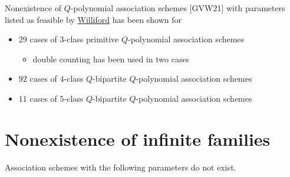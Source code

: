 \documentclass[11pt]{article}
\providecommand{\tightlist}{%
      \setlength{\itemsep}{0pt}\setlength{\parskip}{0pt}}
\renewcommand{\emph}[1]{\textcolor[rgb]{0,0,1}{{#1}}}
\renewcommand{\sout}[1]{\textcolor[rgb]{0,0.5,0}{{#1}}}
\begin{document}
\sout{Nonexistence} of \emph{\(Q\)-polynomial association schemes}
{[}GVW21{]} with parameters listed as \emph{feasible} by
\href{http://www.uwyo.edu/jwilliford/}{Williford} has been shown for
\begin{itemize}
\tightlist
\item \sout{\(29\)} cases of \emph{\(3\)-class primitive} \(Q\)-polynomial
association schemes
  \begin{itemize}
  \tightlist
  \item \emph{double counting} has been used in \sout{two} cases
  \end{itemize}
\item \sout{\(92\)} cases of \emph{\(4\)-class \(Q\)-bipartite}
\(Q\)-polynomial association schemes
\item \sout{\(11\)} cases of
\emph{\(5\)-class \(Q\)-bipartite} \(Q\)-polynomial association schemes
\end{itemize}

\newpage

    \hypertarget{nonexistence-of-infinite-families}{%
\section*{Nonexistence of infinite
families}\label{nonexistence-of-infinite-families}}

Association schemes with the following parameters do not exist.
\end{document}
